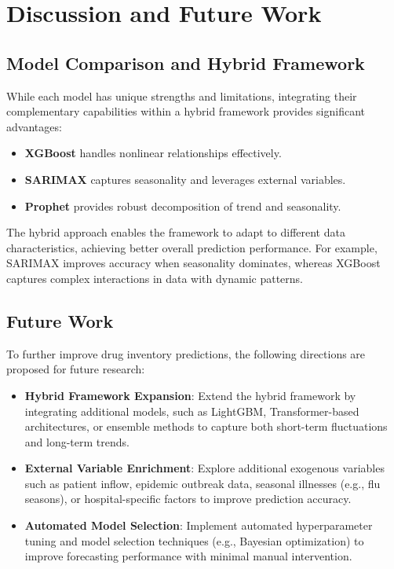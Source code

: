\documentclass[journal]{IEEEtran}
\begin{document}
\section{Discussion and Future Work}
\subsection{Model Comparison and Hybrid Framework}
While each model has unique strengths and limitations, integrating their complementary capabilities within a hybrid framework provides significant advantages:

\begin{itemize}
    \item \textbf{XGBoost} handles nonlinear relationships effectively.
    \item \textbf{SARIMAX} captures seasonality and leverages external variables.
    \item \textbf{Prophet} provides robust decomposition of trend and seasonality.
\end{itemize}

The hybrid approach enables the framework to adapt to different data characteristics, achieving better overall prediction performance. For example, SARIMAX improves accuracy when seasonality dominates, whereas XGBoost captures complex interactions in data with dynamic patterns.

\subsection{Future Work}
To further improve drug inventory predictions, the following directions are proposed for future research:

\begin{itemize}
    \item \textbf{Hybrid Framework Expansion}: Extend the hybrid framework by integrating additional models, such as LightGBM, Transformer-based architectures, or ensemble methods to capture both short-term fluctuations and long-term trends.
    \item \textbf{External Variable Enrichment}: Explore additional exogenous variables such as patient inflow, epidemic outbreak data, seasonal illnesses (e.g., flu seasons), or hospital-specific factors to improve prediction accuracy.
    \item \textbf{Automated Model Selection}: Implement automated hyperparameter tuning and model selection techniques (e.g., Bayesian optimization) to improve forecasting performance with minimal manual intervention.
\end{itemize}
\end{document}
